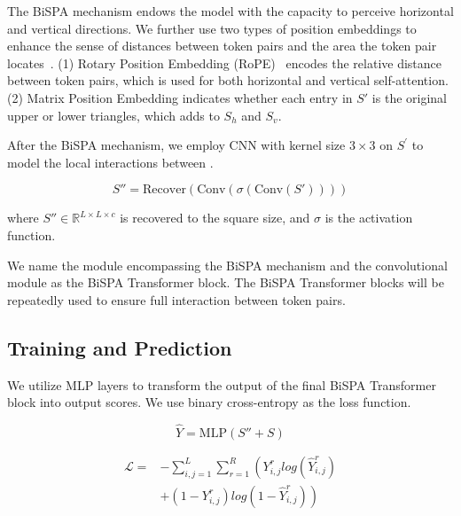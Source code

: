 The BiSPA mechanism endows the model with the capacity to perceive horizontal and vertical directions.
We further use two types of position embeddings to enhance the sense of  distances between token pairs and the area the token pair locates~\cite{yan-etal-2023-utc}. (1) Rotary Position Embedding (RoPE)~\cite{su2024roformer} 
encodes the relative distance between token pairs,
which is used for both horizontal and vertical self-attention.
(2) Matrix Position Embedding indicates whether each entry in $S'$ is the original upper or lower triangles,
which adds to $S_{h}$ and $S_{v}$.

After the BiSPA mechanism, we employ  CNN 
with kernel size $3 \times 3$ on $S^{'}$ to model the local interactions between \tokenspans.

\begin{equation}
{S}''= \text{Recover} ( \text{Conv}\left ( \sigma \left ( \text{Conv}\left ( {S}' \right ) \right ) \right ) ) \label{eq5}
\end{equation}

\noindent where ${S}''\in \mathbb{R}^{L\times L \times c}$ is recovered to the square size,
and $\sigma $ is the activation function. 

We name the module encompassing the BiSPA mechanism and the convolutional module as the BiSPA Transformer block.
The BiSPA Transformer blocks will be repeatedly used to ensure full interaction between token pairs.

\subsection{Training and Prediction}

We utilize MLP layers to transform the output of the final BiSPA Transformer block into output scores. We use binary cross-entropy as the loss function.

\begin{equation}
\widehat{Y}=\text{MLP}\left ( {S}''+ S \right )\label{eq6}
\end{equation}

\begin{align}
\mathcal{L}= &-\sum_{i,j=1}^{L}\sum_{r=1}^{R}\left ( Y_{i,j}^{r}log\left ( \widehat{Y}_{i,j}^{r} \right ) \right.\\
&\left. +\left ( 1-Y_{i,j}^{r} \right )log\left ( 1-\widehat{Y}_{i,j}^{r} \right ) \right )
\label{eq7}
\end{align}

